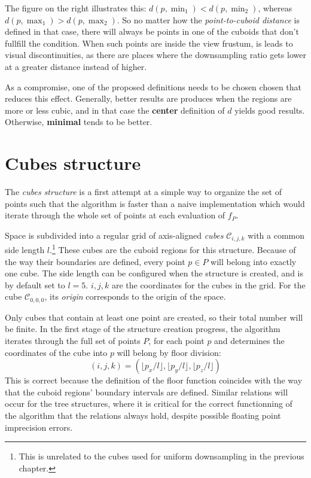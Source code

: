 \documentclass[a4paper,10pt,abstracton,notitlepage]{scrreprt}
\begin{document}
The figure on the right illustrates this: $d(p, \min_{1}) < d(p, \min_{2})$, whereas $d(p, \max_{1}) > d(p, \max_{2})$. So no matter how the \emph{point-to-cuboid distance} is defined in that case, there will always be points in one of the cuboids that don't fullfill the condition. When such points are inside the view frustum, is leads to visual discontinuities, as there are places where the downsampling ratio gets lower at a greater distance instead of higher.

As a compromise, one of the proposed definitions needs to be chosen chosen that reduces this effect. Generally, better results are produces when the regions are more or less cubic, and in that case the \textbf{center} definition of $d$ yields good results. Otherwise, \textbf{minimal} tends to be better.

\pagebreak

\section{Cubes structure}
The \emph{cubes structure} is a first attempt at a simple way to organize the set of points such that the algorithm is faster than a naive implementation which would iterate through the whole set of points at each evaluation of $f_{P}$.

Space is subdivided into a regular grid of axis-aligned \emph{cubes} $\mathcal{C}_{i,j,k}$ with a common side length $l$.\footnote{This is unrelated to the cubes used for uniform downsampling in the previous chapter.} These cubes are the cuboid regions for this structure. Because of the way their boundaries are defined, every point $p \in P$ will belong into exactly one cube. The side length can be configured when the structure is created, and is by default set to $l = 5$. $i, j, k$ are the coordinates for the cubes in the grid. For the cube $\mathcal{C}_{0,0,0}$, its \emph{origin} corresponds to the origin of the space.

Only cubes that contain at least one point are created, so their total number will be finite. In the first stage of the structure creation progress, the algorithm iterates through the full set of points $P$, for each point $p$ and determines the coordinates of the cube into $p$ will belong by floor division:
\begin{equation*}
	(i, j, k) = \left( \lfloor p_{x}/l \rfloor, \lfloor p_{y}/l \rfloor, \lfloor p_{z}/l \rfloor \right)
\end{equation*}
This is correct because the definition of the floor function coincides with the way that the cuboid regions' boundary intervals are defined. Similar relations will occur for the tree structures, where it is critical for the correct functionning of the algorithm that the relations always hold, despite possible floating point imprecision errors.
\end{document}
